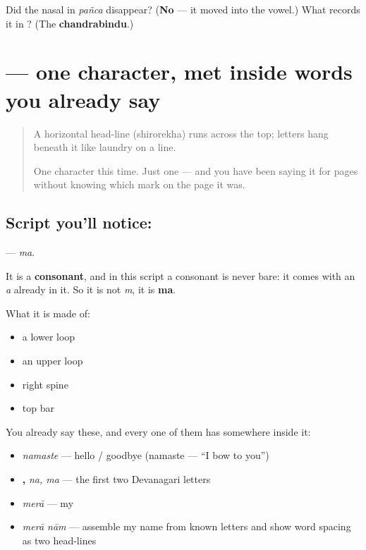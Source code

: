 \begin{tcolorbox}[breakable,colback=teal!4,colframe=teal!35!black,title={Before you move on}]
Did the nasal in \emph{pañca} disappear? (\textbf{No} — it moved into the vowel.) What records it in \textbf{}? (The \textbf{chandrabindu}.)
\end{tcolorbox}
\section[\texorpdfstring{\hi{म} (ma)}{म (ma)}]{ — one character, met inside words you already say}

\label{lesson:HI-S01-letter-ma}



\begin{quote}
A horizontal head-line (shirorekha) runs across the top; letters hang beneath it like laundry on a line.

One character this time. Just one — and you have been saying it for pages without knowing which mark on the page it was.
\end{quote}

\subsection*{Script you'll notice: }
\textbf{} — \emph{ma}.

It is a \textbf{consonant}, and in this script a consonant is never bare: it comes with an \emph{a} already in it. So it is not \emph{m}, it is \textbf{ma}.

What it is made of:

\begin{itemize}
\raggedright
  \item a lower loop
  \item an upper loop
  \item right spine
  \item top bar
\end{itemize}

You already say these, and every one of them has  somewhere inside it:

\begin{itemize}
\raggedright
  \item \textbf{} \emph{namaste} — hello / goodbye (namaste — \textquotedblleft{}I bow to you\textquotedblright{})
  \item \textbf{, } \emph{na, ma} — the first two Devanagari letters
  \item \textbf{} \emph{merā} — my
  \item \textbf{ } \emph{merā nām} — assemble my name from known letters and show word spacing as two head-lines
\end{itemize}

